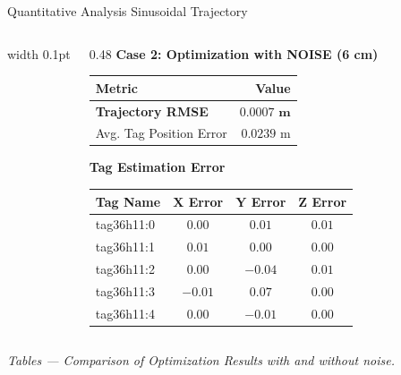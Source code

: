 \begin{frame}{Quantitative Analysis Sinusoidal Trajectory}
\begin{columns}[T]
        \vrule width 0.1pt

        \begin{column}{0.48\textwidth}
            \centering
            \textbf{Case 2: Optimization with NOISE (6 cm)}
            \vspace{0.1cm}
            
            \begin{tabular}{lr}
                \toprule
                \textbf{Metric} & \textbf{Value} \\
                \midrule
                \textbf{Trajectory RMSE} & $\mathbf{0.0007 \text{ m}}$ \\ %
                Avg. Tag Position Error & $0.0239 \text{ m}$ \\
                \bottomrule
            \end{tabular}

            \vspace{0.3cm}
            
            \textbf{Tag Estimation Error}
            \begin{tabular}{lccc}
                \toprule
                \textbf{Tag Name} & $\mathbf{X}$ \textbf{Error} & $\mathbf{Y}$ \textbf{Error} & $\mathbf{Z}$ \textbf{Error} \\
                \midrule
                tag36h11:0 & $0.00$ & $0.01$ & $0.01$ \\
                tag36h11:1 & $0.01$ & $0.00$ & $0.00$ \\
                tag36h11:2 & $0.00$ & $-0.04$ & $0.01$ \\
                tag36h11:3 & $-0.01$ & $0.07$ & $0.00$ \\
                tag36h11:4 & $0.00$ & $-0.01$ & $0.00$ \\
                \bottomrule
            \end{tabular}
            
        \end{column}

    \end{columns}
    
    \begin{center}
        \textit{Tables — Comparison of Optimization Results with and without noise.}
    \end{center}
\end{frame}



